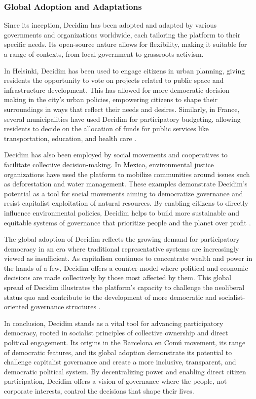 \begin{refsection}
\subsubsection{Global Adoption and Adaptations}

Since its inception, Decidim has been adopted and adapted by various governments and organizations worldwide, each tailoring the platform to their specific needs. Its open-source nature allows for flexibility, making it suitable for a range of contexts, from local government to grassroots activism.

In Helsinki, Decidim has been used to engage citizens in urban planning, giving residents the opportunity to vote on projects related to public space and infrastructure development. This has allowed for more democratic decision-making in the city’s urban policies, empowering citizens to shape their surroundings in ways that reflect their needs and desires. Similarly, in France, several municipalities have used Decidim for participatory budgeting, allowing residents to decide on the allocation of funds for public services like transportation, education, and health care \cite[pp.~18-38]{blanco2020urban}.

Decidim has also been employed by social movements and cooperatives to facilitate collective decision-making. In Mexico, environmental justice organizations have used the platform to mobilize communities around issues such as deforestation and water management. These examples demonstrate Decidim’s potential as a tool for social movements aiming to democratize governance and resist capitalist exploitation of natural resources. By enabling citizens to directly influence environmental policies, Decidim helps to build more sustainable and equitable systems of governance that prioritize people and the planet over profit \cite[pp.~45-60]{smith2009}.

The global adoption of Decidim reflects the growing demand for participatory democracy in an era where traditional representative systems are increasingly viewed as insufficient. As capitalism continues to concentrate wealth and power in the hands of a few, Decidim offers a counter-model where political and economic decisions are made collectively by those most affected by them. This global spread of Decidim illustrates the platform’s capacity to challenge the neoliberal status quo and contribute to the development of more democratic and socialist-oriented governance structures \cite[pp.~120-136]{marx2018}.

In conclusion, Decidim stands as a vital tool for advancing participatory democracy, rooted in socialist principles of collective ownership and direct political engagement. Its origins in the Barcelona en Comú movement, its range of democratic features, and its global adoption demonstrate its potential to challenge capitalist governance and create a more inclusive, transparent, and democratic political system. By decentralizing power and enabling direct citizen participation, Decidim offers a vision of governance where the people, not corporate interests, control the decisions that shape their lives.


\end{refsection}
